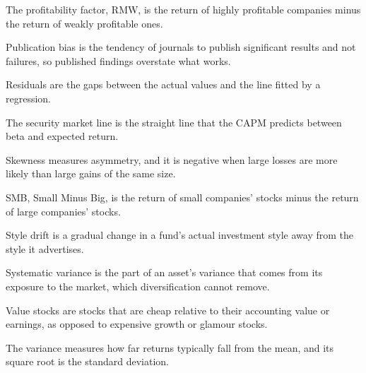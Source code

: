\begin{keyterms}
\begin{description}[leftmargin=0pt, itemsep=0pt, parsep=0pt, topsep=0pt, font=\normalfont\bfseries\color{FEMaroon}]
  \item[Profitability factor.] The profitability factor, RMW, is the return of highly profitable companies minus the return of weakly profitable ones.
  \item[Publication bias.] Publication bias is the tendency of journals to publish significant results and not failures, so published findings overstate what works.
  \item[Residuals.] Residuals are the gaps between the actual values and the line fitted by a regression.
  \item[Security market line.] The security market line is the straight line that the CAPM predicts between beta and expected return.
  \item[Skewness.] Skewness measures asymmetry, and it is negative when large losses are more likely than large gains of the same size.
  \item[SMB.] SMB, Small Minus Big, is the return of small companies' stocks minus the return of large companies' stocks.
  \item[Style drift.] Style drift is a gradual change in a fund's actual investment style away from the style it advertises.
  \item[Systematic variance.] Systematic variance is the part of an asset's variance that comes from its exposure to the market, which diversification cannot remove.
  \item[Value stocks.] Value stocks are stocks that are cheap relative to their accounting value or earnings, as opposed to expensive growth or glamour stocks.
  \item[Variance.] The variance measures how far returns typically fall from the mean, and its square root is the standard deviation.
\end{description}
\end{keyterms}
